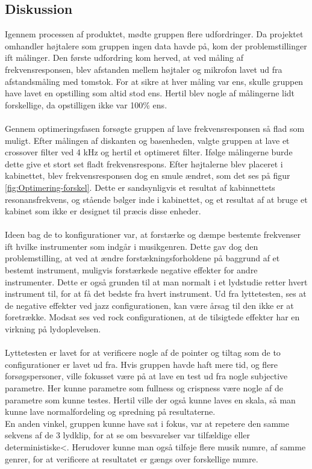 \subsection{Diskussion}
Igennem processen af produktet, mødte gruppen flere udfordringer. Da projektet omhandler højtalere som gruppen ingen data havde på, kom der problemstillinger ift målinger. Den første udfordring kom herved, at ved måling af frekvensresponsen, blev afstanden mellem højtaler og mikrofon lavet ud fra afstandsmåling med tomstok. For at sikre at hver måling var ens, skulle gruppen have lavet en opstilling som altid stod ens. Hertil blev nogle af målingerne lidt forskellige, da opstilligen ikke var 100\% ens. \\ \\
Gennem optimeringsfasen forsøgte gruppen af lave frekvensresponsen så flad som muligt. Efter målingen af diskanten og basenheden, valgte gruppen at lave et crossover filter ved 4 kHz og hertil et optimeret filter. Ifølge målingerne burde dette give et stort set fladt frekvensrespons. Efter højtalerne blev placeret i kabinettet, blev frekvensresponsen dog en smule ændret, som det ses på figur \ref{fig:Optimering-forskel}. Dette er sandsynligvis et resultat af kabinnettets resonansfrekvens, og stående bølger inde i kabinettet, og et resultat af at bruge et kabinet som ikke er designet til præcis disse enheder. \\ \\
Ideen bag de to konfigurationer var, at forstærke og dæmpe bestemte frekvenser ift hvilke instrumenter som indgår i musikgenren. Dette gav dog den problemstilling, at ved at ændre forstækningsforholdene på baggrund af et bestemt instrument, muligvis forstærkede negative effekter for andre instrumenter. Dette er også grunden til at man normalt i et lydstudie retter hvert instrument til, for at få det bedste fra hvert instrument. Ud fra lyttetesten, ses at de negative effekter ved jazz configurationen, kan være årsag til den ikke er at foretrække. Modsat ses ved rock configurationen, at de tilsigtede effekter har en virkning på lydoplevelsen. \\ \\
Lyttetesten er lavet for at verificere nogle af de pointer og tiltag som de to configurationer er lavet ud fra. Hvis gruppen havde haft mere tid, og flere forsøgspersoner, ville fokusset være på at lave en test ud fra nogle subjective parametre. Her kunne parametre som fullness og crispness være nogle af de parametre som kunne testes. Hertil ville der også kunne laves en skala, så man kunne lave normalfordeling og spredning på resultaterne.\\ En anden vinkel, gruppen kunne have sat i fokus, var at repetere den samme sekvens af de 3 lydklip, for at se om besvarelser var tilfældige eller deterministiske<. Herudover kunne man også tilføje flere musik numre, af samme genrer, for at verificere at resultatet er gængs over forskellige numre. 

      
